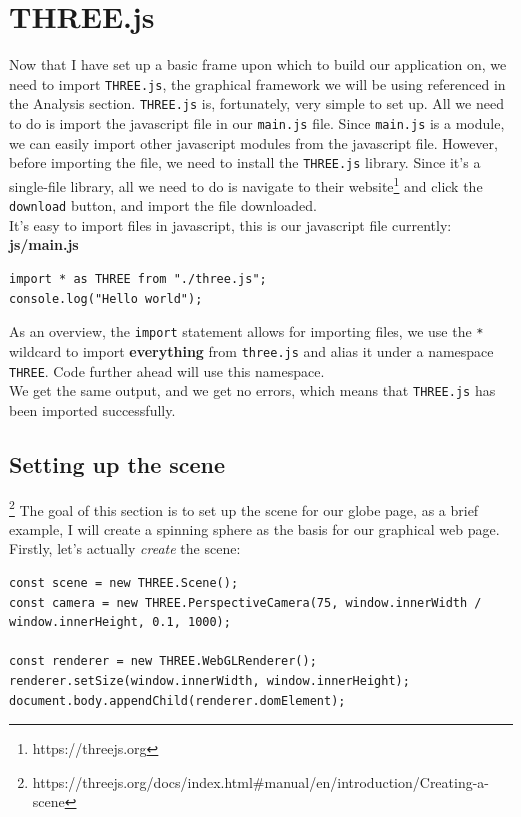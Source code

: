\newpage

\section{THREE.js}
Now that I have set up a basic frame upon which to build our application on, we need to import \verb|THREE.js|, the graphical framework we will be using referenced in the Analysis section. \verb|THREE.js| is, fortunately, very simple to set up. All we need to do is import the javascript file in our \verb|main.js| file. Since \verb|main.js| is a module, we can easily import other javascript modules from the javascript file. However, before importing the file, we need to install the \verb|THREE.js| library. Since it's a single-file library, all we need to do is navigate to their website\footnote{https://threejs.org} and click the \verb|download| button, and import the file downloaded. \\
It's easy to import files in javascript, this is our javascript file currently: \\


\textbf{js/main.js}
\begin{lstlisting}
import * as THREE from "./three.js";
console.log("Hello world");
\end{lstlisting}
As an overview, the \verb|import| statement allows for importing files, we use the \verb|*| wildcard to import \textbf{everything} from \verb|three.js| and alias it under a namespace \verb|THREE|. Code further ahead will use this namespace. \\
We get the same output, and we get no errors, which means that \verb|THREE.js| has been imported successfully.

\newpage

\subsection{Setting up the scene}\footnote{https://threejs.org/docs/index.html\#manual/en/introduction/Creating-a-scene}
The goal of this section is to set up the scene for our globe page, as a brief example, I will create a spinning sphere as the basis for our graphical web page. Firstly, let's actually \textit{create} the scene:

\begin{lstlisting}
const scene = new THREE.Scene();
const camera = new THREE.PerspectiveCamera(75, window.innerWidth / window.innerHeight, 0.1, 1000);

const renderer = new THREE.WebGLRenderer();
renderer.setSize(window.innerWidth, window.innerHeight);
document.body.appendChild(renderer.domElement);
\end{lstlisting}

